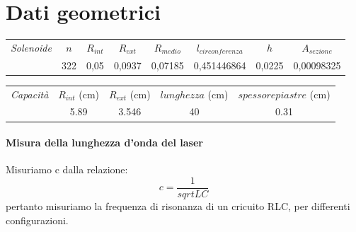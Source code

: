 

\chapter{Dati geometrici}
\begin{center}
\begin{tabular}{|c|c|c|c|c|c|c|c|}
\midrule
\textit{Solenoide} & $n$ & $R_{int}$ & $R_{ext}$ & $R_{medio}$ & $l_{circonferenza}$ & $h$ & $A_{sezione}$  \\
		   & 322 & 0,05	 & 0,0937  & 0,07185 & 0,451446864 & 0,0225 &	0,00098325 \\
 \midrule
\end{tabular}
\end{center}


\begin{center}
\begin{tabular}{|c|c|c|c|c|}
\midrule
\textit{Capacità} & $R_{int}$ (cm) & $R_{ext}$ (cm) & $lunghezza$ (cm) & $spessore piastre$ (cm)\\
   & 5.89 & 3.546  & 40  & 0.31 \\
 \midrule
\end{tabular}
\end{center}

\subsubsection{Misura della lunghezza d'onda del laser}

Misuriamo c dalla relazione:
\begin{equation}
 c=\frac{1}{sqrt{LC}}
\end{equation}
pertanto misuriamo la frequenza di risonanza di un cricuito RLC, per differenti configurazioni.

